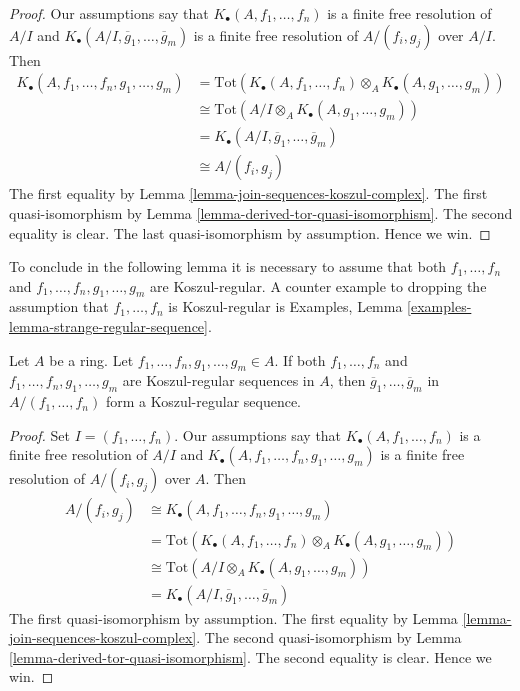 \begin{proof}
Our assumptions say that $K_\bullet(A, f_1, \ldots, f_n)$ is a finite free
resolution of $A/I$ and
$K_\bullet(A/I, \overline{g}_1, \ldots, \overline{g}_m)$ is a
finite free resolution of $A/(f_i, g_j)$ over $A/I$. Then
\begin{align*}
K_\bullet(A, f_1, \ldots, f_n, g_1, \ldots, g_m)
& = \text{Tot}(K_\bullet(A, f_1, \ldots, f_n) \otimes_A
K_\bullet(A, g_1, \ldots, g_m)) \\
& \cong \text{Tot}(A/I \otimes_A K_\bullet(A, g_1, \ldots, g_m)) \\
& = K_\bullet(A/I, \overline{g}_1, \ldots, \overline{g}_m) \\
& \cong A/(f_i, g_j)
\end{align*}
The first equality by
Lemma \ref{lemma-join-sequences-koszul-complex}.
The first quasi-isomorphism by
Lemma \ref{lemma-derived-tor-quasi-isomorphism}.
The second equality is clear. The last quasi-isomorphism by assumption.
Hence we win.
\end{proof}

\noindent
To conclude in the following lemma it is necessary to assume that both
$f_1, \ldots, f_n$ and $f_1, \ldots, f_n, g_1, \ldots, g_m$
are Koszul-regular. A counter example to dropping the assumption
that $f_1, \ldots, f_n$ is Koszul-regular is
Examples, Lemma \ref{examples-lemma-strange-regular-sequence}.

\begin{lemma}
\label{lemma-truncate-koszul-regular}
Let $A$ be a ring. Let $f_1, \ldots, f_n, g_1, \ldots, g_m \in A$.
If both $f_1, \ldots, f_n$ and $f_1, \ldots, f_n, g_1, \ldots, g_m$
are Koszul-regular sequences in $A$, then
$\overline{g}_1, \ldots, \overline{g}_m$ in $A/(f_1, \ldots, f_n)$
form a Koszul-regular sequence.
\end{lemma}

\begin{proof}
Set $I = (f_1, \ldots, f_n)$.
Our assumptions say that $K_\bullet(A, f_1, \ldots, f_n)$ is a finite free
resolution of $A/I$ and
$K_\bullet(A, f_1, \ldots, f_n, g_1, \ldots, g_m)$ is a
finite free resolution of $A/(f_i, g_j)$ over $A$. Then
\begin{align*}
A/(f_i, g_j) & \cong K_\bullet(A, f_1, \ldots, f_n, g_1, \ldots, g_m) \\
& = \text{Tot}(K_\bullet(A, f_1, \ldots, f_n) \otimes_A
K_\bullet(A, g_1, \ldots, g_m)) \\
& \cong \text{Tot}(A/I \otimes_A K_\bullet(A, g_1, \ldots, g_m)) \\
& = K_\bullet(A/I, \overline{g}_1, \ldots, \overline{g}_m)
\end{align*}
The first quasi-isomorphism by assumption.
The first equality by
Lemma \ref{lemma-join-sequences-koszul-complex}.
The second quasi-isomorphism by
Lemma \ref{lemma-derived-tor-quasi-isomorphism}.
The second equality is clear. Hence we win.
\end{proof}

